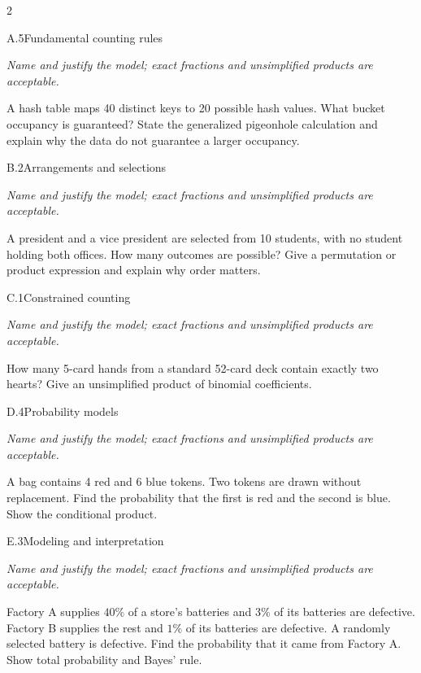 \documentclass[9pt]{extarticle}
\begin{document}
\begin{multicols}{2}
\begin{CoreProblem}{A.5}{Fundamental counting rules}
{\scriptsize\textit{Name and justify the model; exact fractions and unsimplified products are acceptable.}\par}
A hash table maps 40 distinct keys to 20 possible hash values. What
    bucket occupancy is guaranteed? State the generalized pigeonhole calculation
    and explain why the data do not guarantee a larger occupancy.
\end{CoreProblem}
\begin{CoreProblem}{B.2}{Arrangements and selections}
{\scriptsize\textit{Name and justify the model; exact fractions and unsimplified products are acceptable.}\par}
A president and a vice president are selected from 10 students, with
    no student holding both offices. How many outcomes are possible? Give a
    permutation or product expression and explain why order matters.
\end{CoreProblem}
\begin{CoreProblem}{C.1}{Constrained counting}
{\scriptsize\textit{Name and justify the model; exact fractions and unsimplified products are acceptable.}\par}
How many 5-card hands from a standard 52-card deck contain exactly
    two hearts? Give an unsimplified product of binomial coefficients.
\end{CoreProblem}
\columnbreak
\begin{CoreProblem}{D.4}{Probability models}
{\scriptsize\textit{Name and justify the model; exact fractions and unsimplified products are acceptable.}\par}
A bag contains 4 red and 6 blue tokens. Two tokens are drawn without
    replacement. Find the probability that the first is red and the second is
    blue. Show the conditional product.
\end{CoreProblem}
\begin{CoreProblem}{E.3}{Modeling and interpretation}
{\scriptsize\textit{Name and justify the model; exact fractions and unsimplified products are acceptable.}\par}
Factory A supplies $40\%$ of a store's batteries and $3\%$ of its
    batteries are defective. Factory B supplies the rest and $1\%$ of its
    batteries are defective. A randomly selected battery is defective. Find the
    probability that it came from Factory A. Show total probability and Bayes'
    rule.
\end{CoreProblem}
\end{multicols}
\end{document}
